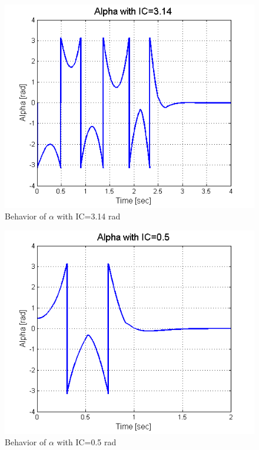 \documentclass{article}
\theoremstyle{plain}
\theoremstyle{definition}
\theoremstyle{remark}
\begin{document}
\begin{figure}[h!]
\includegraphics[width=1\textwidth]{q5_3.png}
\caption{Behavior of $\alpha$ with IC=3.14 rad} \label{tex}
\label{fig:q5_3}
\end{figure}

\begin{figure}[h!]
\includegraphics[width=1\textwidth]{q5_4.png}
\caption{Behavior of $\alpha$ with IC=0.5 rad} \label{tex}
\label{fig:q5_4}
\end{figure}
\end{document}
